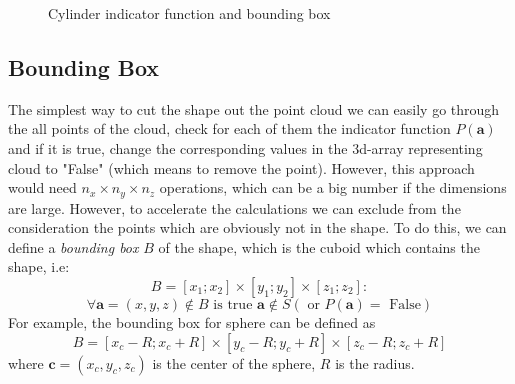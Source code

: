 \documentclass[12pt]{article}
\begin{document}
\begin{figure}
\caption{
Cylinder indicator function and bounding box}
\end{figure}

\subsection{Bounding Box}

The simplest way to cut the shape out the point cloud we can easily go through the all points of the cloud, check for each of them the indicator function $P(\mathbf a)$ and if it is true, change the corresponding values in the 3d-array representing cloud to "False" (which means to remove the point).
However, this approach would need $n_x \times n_y \times n_z$ operations, which can be a big number if the dimensions are large.
However, to accelerate the calculations we can exclude from the consideration the points which are obviously not in the shape. 
To do this, we can define a \emph{bounding box} $B$ of the shape, which is the cuboid which contains the shape, i.e:
\[
  B = [x_1; x_2 ]\times [y_1; y_2]\times [z_1; z_2] : 
\]  
\[ 
    \forall \mathbf{a} = (x,y,z) \notin B \text{~is true~}    \mathbf a \notin S  ( \text{~or~} P(\mathbf a) = \text{~False} )
\]
For example, the bounding box for sphere can be defined as 
\[
   B = [x_c - R; x_c + R] \times [y_c - R; y_c + R] \times [z_c-R; z_c+R]
\]
where $\mathbf c = (x_c,y_c,z_c)$ is the center of the sphere, $R$ is the radius.
\end{document}
